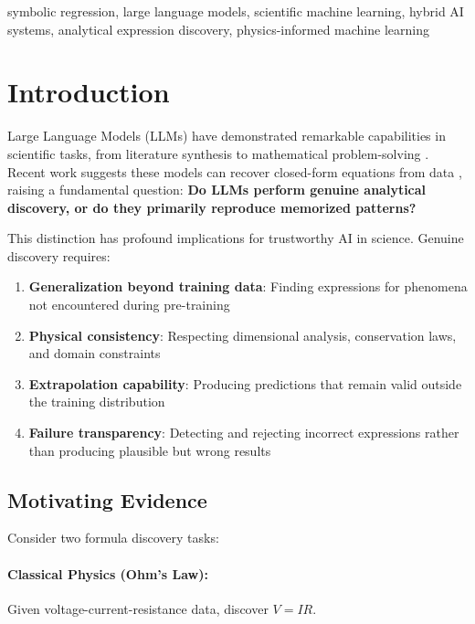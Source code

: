 \documentclass[twoside,11pt]{article}
\begin{document}
\begin{keywords}
symbolic regression, large language models, scientific machine learning, hybrid AI systems, analytical expression discovery, physics-informed machine learning\citep{koza1994genetic}\citep{molnar2020interpretable}\citep{rudin2019stop}\citep{la2021contemporary}\citep{lewkowycz2022minerva}\citep{virtanen2020scipy}
\end{keywords}

\section{Introduction}

Large Language Models (LLMs) have demonstrated remarkable capabilities in scientific tasks, from literature synthesis to mathematical problem-solving \citep{brown2020language,wei2022chain,openai2023gpt4}. Recent work suggests these models can recover closed-form equations from data \citep{romera2023discovering}, raising a fundamental question: \textbf{Do LLMs perform genuine analytical discovery, or do they primarily reproduce memorized patterns?}

This distinction has profound implications for trustworthy AI in science\citep{koza1994genetic}. Genuine discovery requires:
\begin{enumerate}
\item \textbf{Generalization beyond training data}: Finding expressions for phenomena not encountered during pre-training\citep{liu2020understanding}\citep{neyshabur2017exploring}\citep{zhang2021understanding}
\item \textbf{Physical consistency}: Respecting dimensional analysis, conservation laws, and domain constraints
\item \textbf{Extrapolation capability}: Producing predictions that remain valid outside the training distribution
\item \textbf{Failure transparency}: Detecting and rejecting incorrect expressions rather than producing plausible but wrong results
\end{enumerate}

\subsection{Motivating Evidence}

Consider two formula discovery tasks:\citep{koza1994genetic}

\paragraph{Classical Physics (Ohm's Law):} Given voltage-current-resistance data, discover $V = IR$.
\end{document}
